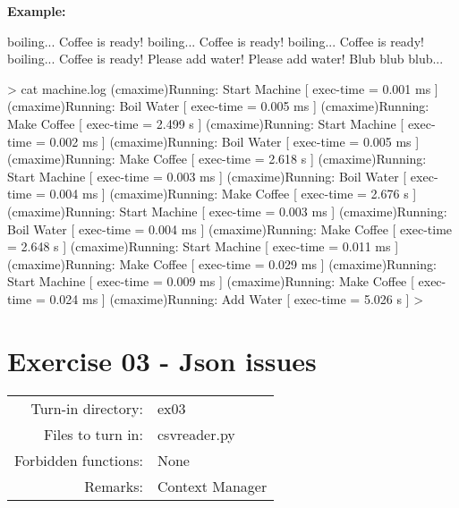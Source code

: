 \documentclass[]{article}
\newenvironment{Shaded}{\begin{snugshade}}{\end{snugshade}}
\newcommand{\NormalTok}[1]{\textcolor[rgb]{0.81,0.81,0.76}{#1}}
\begin{document}
\textbf{Example:}

\begin{Shaded}
\begin{Highlighting}[]
\NormalTok{boiling...}
\NormalTok{Coffee is ready!}
\NormalTok{boiling...}
\NormalTok{Coffee is ready!}
\NormalTok{boiling...}
\NormalTok{Coffee is ready!}
\NormalTok{boiling...}
\NormalTok{Coffee is ready!}
\NormalTok{Please add water!}
\NormalTok{Please add water!}
\NormalTok{Blub blub blub...}
\end{Highlighting}
\end{Shaded}

\begin{Shaded}
\begin{Highlighting}[]
\NormalTok{> cat machine.log}
\NormalTok{(cmaxime)Running: Start Machine     [ exec-time = 0.001 ms ]}
\NormalTok{(cmaxime)Running: Boil Water        [ exec-time = 0.005 ms ]}
\NormalTok{(cmaxime)Running: Make Coffee       [ exec-time = 2.499 s  ]}
\NormalTok{(cmaxime)Running: Start Machine     [ exec-time = 0.002 ms ]}
\NormalTok{(cmaxime)Running: Boil Water        [ exec-time = 0.005 ms ]}
\NormalTok{(cmaxime)Running: Make Coffee       [ exec-time = 2.618 s  ]}
\NormalTok{(cmaxime)Running: Start Machine     [ exec-time = 0.003 ms ]}
\NormalTok{(cmaxime)Running: Boil Water        [ exec-time = 0.004 ms ]}
\NormalTok{(cmaxime)Running: Make Coffee       [ exec-time = 2.676 s  ]}
\NormalTok{(cmaxime)Running: Start Machine     [ exec-time = 0.003 ms ]}
\NormalTok{(cmaxime)Running: Boil Water        [ exec-time = 0.004 ms ]}
\NormalTok{(cmaxime)Running: Make Coffee       [ exec-time = 2.648 s  ]}
\NormalTok{(cmaxime)Running: Start Machine     [ exec-time = 0.011 ms ]}
\NormalTok{(cmaxime)Running: Make Coffee       [ exec-time = 0.029 ms ]}
\NormalTok{(cmaxime)Running: Start Machine     [ exec-time = 0.009 ms ]}
\NormalTok{(cmaxime)Running: Make Coffee       [ exec-time = 0.024 ms ]}
\NormalTok{(cmaxime)Running: Add Water         [ exec-time = 5.026 s  ]}
\NormalTok{>}
\end{Highlighting}
\end{Shaded}

\clearpage

\hypertarget{exercise-03---json-issues-1}{%
\section{Exercise 03 - Json issues}\label{exercise-03---json-issues-1}}

\begin{longtable}[]{@{}rl@{}}
\toprule
\endhead
Turn-in directory: & ex03\tabularnewline
Files to turn in: & csvreader.py\tabularnewline
Forbidden functions: & None\tabularnewline
Remarks: & Context Manager\tabularnewline
\bottomrule
\end{longtable}
\end{document}
